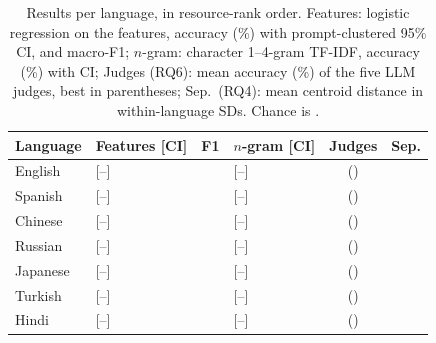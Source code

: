 \documentclass[conference,compsoc]{IEEEtran}
\begin{document}
\begin{table}[t]
\caption{Results per language, in resource-rank order. Features: logistic regression on the \NFeatures{} features, accuracy (\%) with prompt-clustered 95\% CI, and macro-F1; $n$-gram: character 1--4-gram TF-IDF, accuracy (\%) with CI; Judges (RQ6): mean accuracy (\%) of the five LLM judges, best in parentheses; Sep.\ (RQ4): mean centroid distance in within-language SDs. Chance is \Chance{}.}
\label{tab:main}
\centering
\scriptsize
\setlength{\tabcolsep}{3pt}
\begin{tabular}{l l c l c c}
\toprule
Language & Features [CI] & F1 & $n$-gram [CI] & Judges & Sep. \\
\midrule
English  & \LRen{} [\LRloen{}--\LRhien{}] & \Foneen{} & \NGen{} [\NGloen{}--\NGhien{}] & \JudgeMeanen{} (\JudgeBesten{}) & \CentEn{} \\
Spanish  & \LRes{} [\LRloes{}--\LRhies{}] & \Fonees{} & \NGes{} [\NGloes{}--\NGhies{}] & \JudgeMeanes{} (\JudgeBestes{}) & \CentEs{} \\
Chinese  & \LRzh{} [\LRlozh{}--\LRhizh{}] & \Fonezh{} & \NGzh{} [\NGlozh{}--\NGhizh{}] & \JudgeMeanzh{} (\JudgeBestzh{}) & \CentZh{} \\
Russian  & \LRru{} [\LRloru{}--\LRhiru{}] & \Foneru{} & \NGru{} [\NGloru{}--\NGhiru{}] & \JudgeMeanru{} (\JudgeBestru{}) & \CentRu{} \\
Japanese & \LRja{} [\LRloja{}--\LRhija{}] & \Foneja{} & \NGja{} [\NGloja{}--\NGhija{}] & \JudgeMeanja{} (\JudgeBestja{}) & \CentJa{} \\
Turkish  & \LRtr{} [\LRlotr{}--\LRhitr{}] & \Fonetr{} & \NGtr{} [\NGlotr{}--\NGhitr{}] & \JudgeMeantr{} (\JudgeBesttr{}) & \CentTr{} \\
Hindi    & \LRhi{} [\LRlohi{}--\LRhihi{}] & \Fonehi{} & \NGhi{} [\NGlohi{}--\NGhihi{}] & \JudgeMeanhi{} (\JudgeBesthi{}) & \CentHi{} \\
\bottomrule
\end{tabular}
\end{table}
\end{document}

